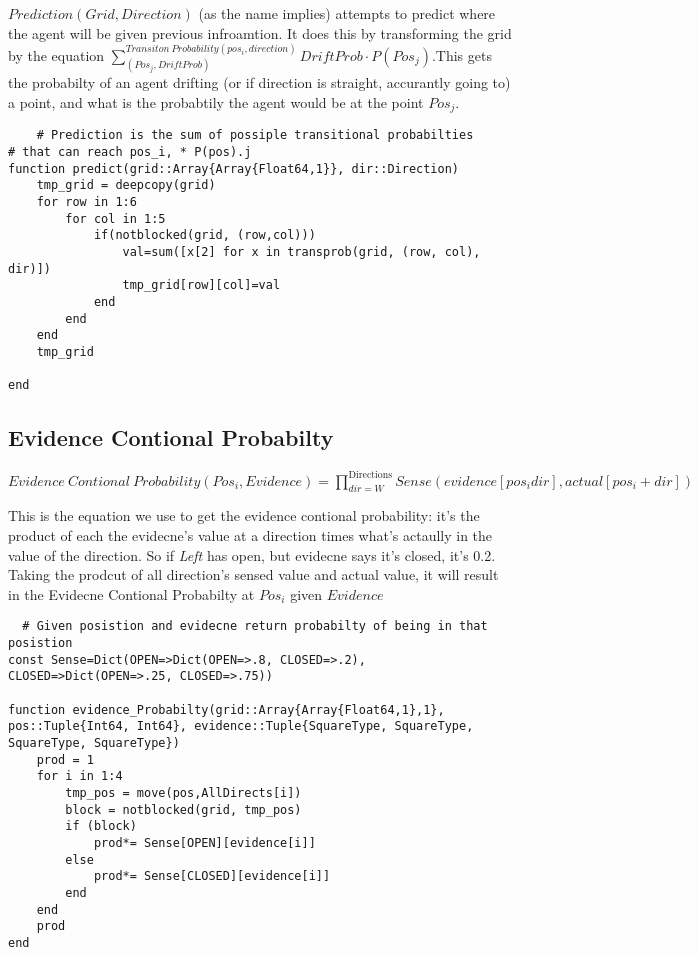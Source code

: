 \documentclass[11pt]{article}
\begin{document}
\(Prediction(Grid, Direction)\) (as the name implies) attempts to predict where the agent will be given previous infroamtion. It does this by transforming the grid by the equation  \(\sum^{Transiton\ Probability(pos_i, direction)}_{(Pos_j, DriftProb)} DriftProb \cdot P(Pos_j)\).This gets the probabilty of an agent drifting (or if direction is straight, accurantly going to) a point, and what is the probabtily the agent would be at the point \(Pos_j\).

\begin{verbatim}
    # Prediction is the sum of possiple transitional probabilties
# that can reach pos_i, * P(pos).j
function predict(grid::Array{Array{Float64,1}}, dir::Direction)
	tmp_grid = deepcopy(grid)
	for row in 1:6
		for col in 1:5
			if(notblocked(grid, (row,col)))
				val=sum([x[2] for x in transprob(grid, (row, col), dir)])
				tmp_grid[row][col]=val
			end
		end
	end
	tmp_grid

end

\end{verbatim}

\subsection{Evidence Contional Probabilty}
\label{sec:org447ad11}
\begin{center}
\(Evidence\ Contional\ Probability(Pos_i, Evidence) =  \prod^{\text{Directions} }_{dir=W} Sense(evidence[pos_i dir], actual[pos_i+dir])\)
\end{center}

This is the equation we use to get the evidence contional probability: it's the product of each the evidecne's value at a direction times what's actaully in the value of the direction. So if \emph{Left} has open, but evidecne says it's closed, it's 0.2. Taking the prodcut of all direction's sensed value and actual value, it will result in the Evidecne Contional Probabilty at \(Pos_i\) given \(Evidence\)

\begin{verbatim}
  # Given posistion and evidecne return probabilty of being in that posistion
const Sense=Dict(OPEN=>Dict(OPEN=>.8, CLOSED=>.2), CLOSED=>Dict(OPEN=>.25, CLOSED=>.75))

function evidence_Probabilty(grid::Array{Array{Float64,1},1}, pos::Tuple{Int64, Int64}, evidence::Tuple{SquareType, SquareType, SquareType, SquareType})
	prod = 1
	for i in 1:4
		tmp_pos = move(pos,AllDirects[i])
		block = notblocked(grid, tmp_pos)
		if (block)
			prod*= Sense[OPEN][evidence[i]]
		else
			prod*= Sense[CLOSED][evidence[i]]
		end
	end
	prod 
end
\end{verbatim}
\end{document}

